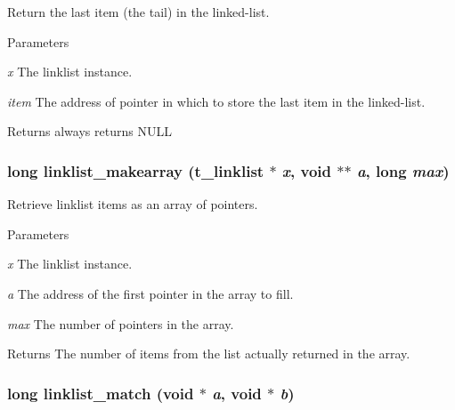 Return the last item (the tail) in the linked-\/list. 
\begin{DoxyParams}{Parameters}
\item[{\em x}]The linklist instance. \item[{\em item}]The address of pointer in which to store the last item in the linked-\/list. \end{DoxyParams}
\begin{DoxyReturn}{Returns}
always returns NULL 
\end{DoxyReturn}
\hypertarget{group__linklist_ga49aa766d6a1a63de1491f9bdfb3cfe73}{
\subsubsection[{linklist\_\-makearray}]{\setlength{\rightskip}{0pt plus 5cm}long linklist\_\-makearray ({\bf t\_\-linklist} $\ast$ {\em x}, \/  void $\ast$$\ast$ {\em a}, \/  long {\em max})}}
\label{group__linklist_ga49aa766d6a1a63de1491f9bdfb3cfe73}


Retrieve linklist items as an array of pointers. 
\begin{DoxyParams}{Parameters}
\item[{\em x}]The linklist instance. \item[{\em a}]The address of the first pointer in the array to fill. \item[{\em max}]The number of pointers in the array. \end{DoxyParams}
\begin{DoxyReturn}{Returns}
The number of items from the list actually returned in the array. 
\end{DoxyReturn}
\hypertarget{group__linklist_ga2a991fb645404fe7d9d3327e5a386b80}{
\subsubsection[{linklist\_\-match}]{\setlength{\rightskip}{0pt plus 5cm}long linklist\_\-match (void $\ast$ {\em a}, \/  void $\ast$ {\em b})}}
\label{group__linklist_ga2a991fb645404fe7d9d3327e5a386b80}


